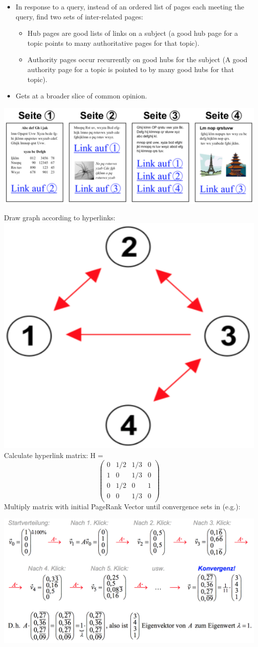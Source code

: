 \begin{breakbox}
\begin{itemize}
	\item In response to a query, instead of an ordered list of pages each meeting the query, find two sets of inter-related pages:
		\begin{itemize}
			\item Hub pages are good lists of links on a subject (a good hub page for a topic points to many authoritative pages for that topic).
			\item Authority pages occur recurrently on good hubs for the subject (A good authority page for a topic is pointed to by many good hubs for that topic).
		\end{itemize}
	\item Gets at a broader slice of common opinion.
\end{itemize}
\end{breakbox}

\begin{breakbox}
\begin{center}
\includegraphics[width=.15\textwidth]{slides_images/page_rank_pages}
\end{center}
Draw graph according to hyperlinks:
\newline \includegraphics[width=.03\textwidth]{slides_images/page_rank_graph}
\newline Calculate hyperlink matrix:
H = \[ \left( \begin{array}{cccc}
0 & 1/2 & 1/3 & 0 \\
1 & 0 & 1/3 & 0 \\
0 & 1/2 & 0 & 1 \\
0 & 0 & 1/3 & 0 \end{array} \right)\]
Multiply matrix with initial PageRank Vector until convergence sets in (e.g.):
\begin{center}
\includegraphics[width=.15\textwidth]{slides_images/page_rank_calc}
\end{center}
\end{breakbox}
















